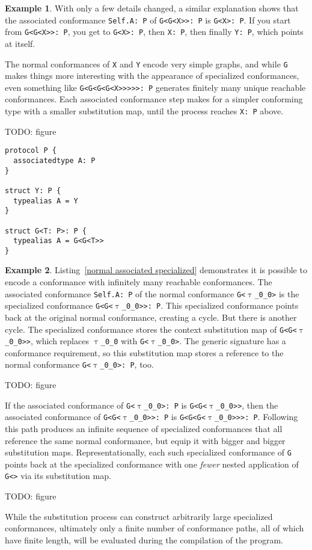 \documentclass[a4paper,headsepline,bibliography=totoc,toc=flat,fleqn,twoside=semi]{scrbook}
\theoremstyle{definition}
\theoremstyle{definition}
\newtheorem{example}{Example}[chapter]
\theoremstyle{definition}
\newcommand{\ttgp}[2]{\texttt{$\uptau$\_#1\_#2}}
\begin{document}
\begin{example}
With only a few details changed, a similar explanation shows that the associated conformance \texttt{Self.A:\ P} of \texttt{G<G<X>>:\ P} is \texttt{G<X>:\ P}. If you start from \texttt{G<G<X>>:\ P}, you get to \texttt{G<X>:\ P}, then \texttt{X:\ P}, then finally \texttt{Y:\ P}, which points at itself.

The normal conformances of \texttt{X} and \texttt{Y} encode very simple graphs, and while \texttt{G} makes things more interesting with the appearance of specialized conformances, even something like \texttt{G<G<G<G<X>>>>>:\ P} generates finitely many unique reachable conformances. Each associated conformance step makes for a simpler conforming type with a smaller substitution map, until the process reaches \texttt{X:\ P} above.

TODO: figure

\begin{listing}\label{normal associated specialized}
\begin{Verbatim}
protocol P {
  associatedtype A: P
}

struct Y: P {
  typealias A = Y
}

struct G<T: P>: P {
  typealias A = G<G<T>>
}
\end{Verbatim}
\end{listing}
\end{example}
\begin{example}
Listing~\ref{normal associated specialized} demonstrates it is possible to encode a conformance with infinitely many reachable conformances. The associated conformance \texttt{Self.A:\ P} of the normal conformance \texttt{G<\ttgp{0}{0}>} is the specialized conformance \texttt{G<G<\ttgp{0}{0}>>:\ P}. This specialized conformance points back at the original normal conformance, creating a cycle. But there is another cycle. The specialized conformance stores the context substitution map of \texttt{G<G<\ttgp{0}{0}>>}, which replaces \ttgp{0}{0} with \texttt{G<\ttgp{0}{0}>}. The generic signature has a conformance requirement, so this substitution map stores a reference to the normal conformance \texttt{G<\ttgp{0}{0}>:\ P}, too.

TODO: figure

If the associated conformance of \texttt{G<\ttgp{0}{0}>:\ P} is \texttt{G<G<\ttgp{0}{0}>>}, then the associated conformance of \texttt{G<G<\ttgp{0}{0}>>:\ P} is \texttt{G<G<G<\ttgp{0}{0}>>>:\ P}. Following this path produces an infinite sequence of specialized conformances that all reference the same normal conformance, but equip it with bigger and bigger substitution maps. Representationally, each such specialized conformance of \texttt{G} points back at the specialized conformance with one \emph{fewer} nested application of \texttt{G<>} via its substitution map.

TODO: figure

While the substitution process can construct arbitrarily large specialized conformances, ultimately only a finite number of conformance paths, all of which have finite length, will be evaluated during the compilation of the program.
\end{example}
\end{document}

